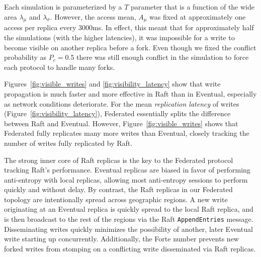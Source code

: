 \documentclass[10pt,conference,letterpaper]{IEEEtran}
\newcommand{\todo}[1]{{\textcolor{red}{#1}}}
\newcommand{\pjk}[1]{[\todo{PJK: #1}]}
\begin{document}
Each simulation is parameterized by a $T$ parameter that is a function of the
wide area $\lambda_{\mu}$ and $\lambda_{\sigma}$.
However, the access mean, $A_{\mu}$ was fixed at approximately one access per replica every
3000ms.
In effect, this meant that for approximately half the simulations (with the higher
latencies), it was impossible for a write to become visible on another replica before a
fork.
Even though we fixed the conflict probability as $P_c=0.5$ there was still enough conflict
in the simulation to force each protocol to handle many forks.


Figures~\ref{fig:visible_writes} and \ref{fig:visibility_latency} show that
write propagation is much faster and more effective in Raft than in Eventual,
especially as network conditions deteriorate.
For the mean \emph{replication latency} of writes
(Figure~\ref{fig:visibility_latency}), Federated essentially splits the
difference between Raft and Eventual.
However, Figure~\ref{fig:visible_writes} shows that Federated fully replicates
many more writes than Eventual, closely tracking the number of writes fully
replicated by Raft.

The strong inner core of Raft replicas is the key to the Federated protocol
tracking Raft's performance.
Eventual replicas are biased in favor of performing anti-entropy with local
replicas, allowing most anti-entropy sessions to perform quickly and without
delay.
By contrast, the Raft replicas in our Federated topology are intentionally
spread across geographic regions.
A new write originating at an Eventual replica is quickly spread to the local
Raft replica, and is then broadcast to the rest of the regions via the Raft
\texttt{AppendEntries} message.
Disseminating writes quickly minimizes the possibility of another, later
Eventual write starting up concurrently.
Additionally, the Forte number prevents new forked writes from stomping on a
conflicting write disseminated via Raft replicas.
\end{document}
